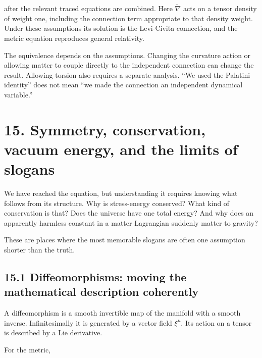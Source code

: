 \documentclass[
  11pt,
  letterpaper,
  oneside,
  openany]{scrbook}
\begin{document}
after the relevant traced equations are combined. Here
\(\widetilde\nabla\) acts on a tensor density of weight one, including
the connection term appropriate to that density weight. Under these
assumptions its solution is the Levi-Civita connection, and the metric
equation reproduces general relativity.

The equivalence depends on the assumptions. Changing the curvature
action or allowing matter to couple directly to the independent
connection can change the result. Allowing torsion also requires a
separate analysis. ``We used the Palatini identity'' does not mean ``we
made the connection an independent dynamical variable.''

\hypertarget{chapter-15}{%
\chapter{15. Symmetry, conservation, vacuum energy, and the limits of
slogans}\label{chapter-15}}

We have reached the equation, but understanding it requires knowing what
follows from its structure. Why is stress-energy conserved? What kind of
conservation is that? Does the universe have one total energy? And why
does an apparently harmless constant in a matter Lagrangian suddenly
matter to gravity?

These are places where the most memorable slogans are often one
assumption shorter than the truth.

\hypertarget{diffeomorphisms-moving-the-mathematical-description-coherently}{%
\section{15.1 Diffeomorphisms: moving the mathematical description
coherently}\label{diffeomorphisms-moving-the-mathematical-description-coherently}}

A diffeomorphism is a smooth invertible map of the manifold with a
smooth inverse. Infinitesimally it is generated by a vector field
\(\xi^\mu\). Its action on a tensor is described by a Lie derivative.

For the metric,

\begin{center}
\begingroup
{}
\ifdim\wd\grmathbox>\linewidth
\resizebox{\linewidth}{!}{\usebox{\grmathbox}}
\else\usebox{\grmathbox}\fi
\endgroup
\end{center}
\end{document}
